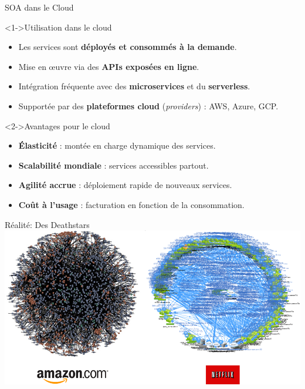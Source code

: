 \documentclass[aspectratio=169,10pt]{beamer}
\begin{document}
\begin{frame}{SOA dans le Cloud}

    \begin{alertblock}<1->{Utilisation dans le cloud}
      \begin{itemize}
        \item Les services sont \textbf{déployés et consommés à la demande}.
        \item Mise en œuvre via des \textbf{APIs exposées en ligne}.
        \item Intégration fréquente avec des \textbf{microservices} et du \textbf{serverless}.
        \item Supportée par des \textbf{plateformes cloud} (\emph{providers}) : AWS, Azure, GCP.
      \end{itemize}
    \end{alertblock}

    \begin{alertblock}<2->{Avantages pour le cloud}
      \begin{itemize}
        \item \textbf{Élasticité} : montée en charge dynamique des services.
        \item \textbf{Scalabilité mondiale} : services accessibles partout.
        \item \textbf{Agilité accrue} : déploiement rapide de nouveaux services.
        \item \textbf{Coût à l’usage} : facturation en fonction de la consommation.
      \end{itemize}
    \end{alertblock}

\end{frame}


\begin{frame}{Réalité: Des Deathstars}
\centering
\includegraphics[scale=0.4]{figures/deathstar.png}

\end{frame}
\end{document}

